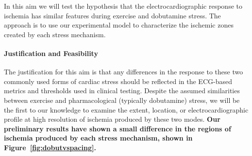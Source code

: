 In this aim we will test the
hypothesis that the electrocardiographic response to ischemia has similar
features during exercise and dobutamine stress. The approach is to use our
experimental model
to characterize the ischemic zones created by each
stress mechanism. 

\paragraph{Justification and Feasibility} The justification for this aim
is that any differences in the response to these two commonly used forms of
cardiac stress should be reflected in the ECG-based metrics and thresholds
used in clinical testing.  Despite the assumed similarities between exercise
and pharmacological (typically dobutamine) stress, we will be the first to
our knowledge to examine the extent, location, or electrocardiographic
profile at high resolution of ischemia produced by these two
modes. \textbf{Our preliminary results have shown a small difference in the
  regions of ischemia produced by each stress mechanism, shown in
  Figure~\ref{fig:dobutvspacing}.}



